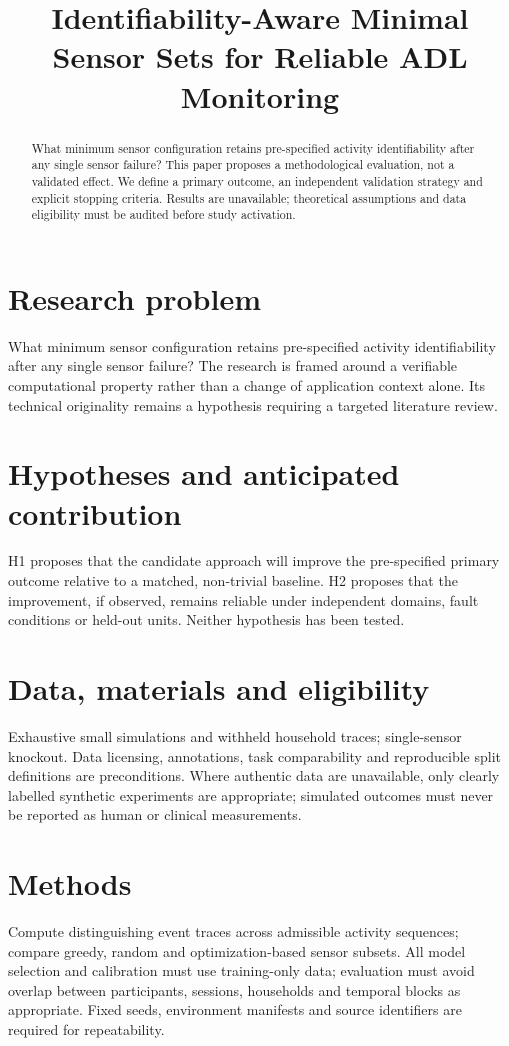 \documentclass[11pt,a4paper]{article}
\title{Identifiability-Aware Minimal Sensor Sets for Reliable ADL Monitoring}
\author{}
\date{}
\begin{document}
\maketitle
\begin{abstract}
What minimum sensor configuration retains pre-specified activity identifiability after any single sensor failure? This paper proposes a methodological evaluation, not a validated effect. We define a primary outcome, an independent validation strategy and explicit stopping criteria. Results are unavailable; theoretical assumptions and data eligibility must be audited before study activation.
\end{abstract}
\section{Research problem}
What minimum sensor configuration retains pre-specified activity identifiability after any single sensor failure? The research is framed around a verifiable computational property rather than a change of application context alone. Its technical originality remains a hypothesis requiring a targeted literature review.
\section{Hypotheses and anticipated contribution}
H1 proposes that the candidate approach will improve the pre-specified primary outcome relative to a matched, non-trivial baseline. H2 proposes that the improvement, if observed, remains reliable under independent domains, fault conditions or held-out units. Neither hypothesis has been tested.
\section{Data, materials and eligibility}
Exhaustive small simulations and withheld household traces; single-sensor knockout. Data licensing, annotations, task comparability and reproducible split definitions are preconditions. Where authentic data are unavailable, only clearly labelled synthetic experiments are appropriate; simulated outcomes must never be reported as human or clinical measurements.
\section{Methods}
Compute distinguishing event traces across admissible activity sequences; compare greedy, random and optimization-based sensor subsets. All model selection and calibration must use training-only data; evaluation must avoid overlap between participants, sessions, households and temporal blocks as appropriate. Fixed seeds, environment manifests and source identifiers are required for repeatability.
\end{document}
